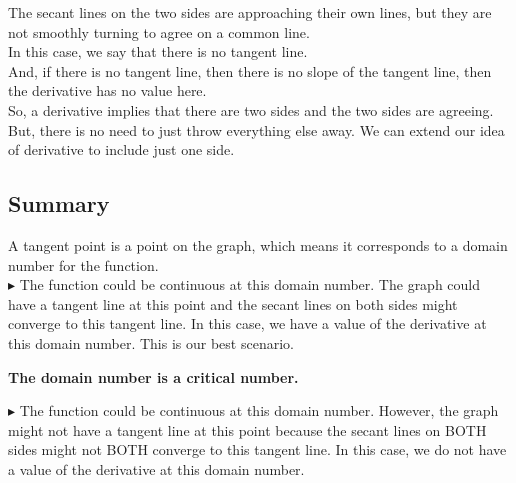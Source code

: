 \documentclass{ximera}
\begin{document}
The secant lines on the two sides are approaching their own lines, but they are not smoothly turning to agree on a common line. \\


In this case, we say that there is no tangent line. \\

And, if there is no tangent line, then there is no slope of the tangent line, then the derivative has no value here. \\







So, a derivative implies that there are two sides and the two sides are agreeing. \\



But, there is no need to just throw everything else away.  We can extend our idea of derivative to include just one side. \\ 






\subsection*{Summary}


A tangent point is a point on the graph, which means it corresponds to a domain number for the function. \\


\textbf{\textcolor{blue!55!black}{$\blacktriangleright$}}  The function could be continuous at this domain number. The graph could have a tangent line at this point and the secant lines on both sides might converge to this tangent line.  In this case, we have a value of the derivative at this domain number. This is our best scenario. \\

\begin{center}
\textbf{\textcolor{blue!55!black}{The domain number is a critical number.}}
\end{center}


\textbf{\textcolor{blue!55!black}{$\blacktriangleright$}}  The function could be continuous at this domain number.  However, the graph might not have a tangent line at this point because the secant lines on BOTH sides might not BOTH converge to this tangent line.  In this case, we do not have a value of the derivative at this domain number. \\
\end{document}

